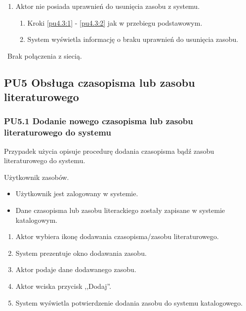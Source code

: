 \begin{enumerate}
\item Aktor nie posiada uprawnień do usunięcia zasobu z systemu.
	\begin{enumerate}[label*=\arabic*.]
		\item Kroki \ref{pu4.3:1} - \ref{pu4.3:2} jak w przebiegu podstawowym.
		\item System wyświetla informację o braku uprawnień do usunięcia zasobu.
	\end{enumerate}
\end{enumerate}

\
Brak połączenia z siecią.

\subsection{PU5 Obsługa czasopisma lub zasobu literaturowego} \label{pu5}
\subsubsection{PU5.1 Dodanie nowego czasopisma lub zasobu literaturowego do systemu}

Przypadek użycia opisuje procedurę dodania czasopisma bądź zasobu literaturowego do systemu.

Użytkownik zasobów.

\begin{itemize}
\item Użytkownik jest zalogowany w systemie.
\end{itemize}

\begin{itemize}
\item Dane czasopisma lub zasobu literackiego zostały zapisane w systemie katalogowym.
\end{itemize}

\begin{enumerate}
\item \label{pu5.1:1} Aktor wybiera ikonę dodawania czasopisma/zasobu literaturowego.
\item System prezentuje okno dodawania zasobu.
\item Aktor podaje dane dodawanego zasobu.
\item \label{pu5.1:4} Aktor wciska przycisk ,,Dodaj''.
\item System wyświetla potwierdzenie dodania zasobu do systemu katalogowego.
\end{enumerate}

